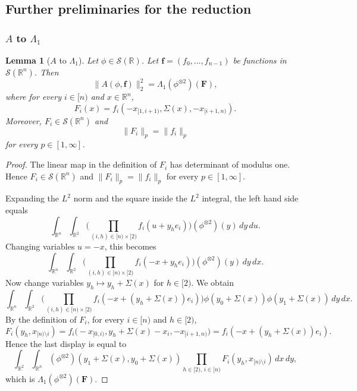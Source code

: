 \documentclass[12pt,reqno]{amsart}
\theoremstyle{plain}
\newtheorem{lemma}[theorem]{Lemma}
\numberwithin{equation}{section}
\theoremstyle{remark}
\newcommand{\R}{{\mathbb R}}
\begin{document}
\subsection{Further preliminaries for the reduction}\label{sec:prelim red}

\subsubsection{\texorpdfstring{$A$ to $\Lambda_1$}{Average to prism form}}

\begin{lemma}[$A$ to $\Lambda_1$]\label{A to Lambda}
Let $\phi\in \mathcal{S}(\R)$.
Let $\mathbf{f}=(f_0,\dots,f_{n-1})$ be functions in $\mathcal{S}(\R^n)$.
Then
\begin{equation}\label{auto:twisted-average-prism-identity}
\|A(\phi, {\mathbf f})\|_2^2 = \Lambda_1(\phi^{\otimes 2})(\mathbf{F}),
\end{equation}
where for every $i\in[n)$ and $x\in\R^n$,
\begin{equation}\label{auto:twisted-average-coordinate-transform}
F_i(x)=f_i(-x_{[1,i+1)},\Sigma(x),-x_{[i+1,n)}).
\end{equation}
Moreover, $F_i\in\mathcal S(\R^n)$ and
\begin{equation}\label{auto:twisted-average-coordinate-transform-isometry}
\|F_i\|_p=\|f_i\|_p
\end{equation}
for every $p\in[1,\infty]$.
\end{lemma}

\begin{proof}
The linear map in the definition of $F_i$ has determinant of modulus one. Hence $F_i\in\mathcal S(\R^n)$ and $\|F_i\|_p=\|f_i\|_p$ for every $p\in[1,\infty]$.

Expanding the $L^2$ norm and the square inside the $L^2$ integral, the left hand side equals
\[
 \int_{\R^n} \int_{\mathbb{R}^2}
 \Big(\prod_{(i,h)\in [n)\times [2)} f_i(u+y_h e_i) \Big)
 (\phi^{\otimes 2})(y)\, dy\, du .
\]
Changing variables $u=-x$, this becomes
\[
 \int_{\R^n} \int_{\mathbb{R}^2}
 \Big(\prod_{(i,h)\in [n)\times [2)} f_i(-x+y_h e_i) \Big)
 (\phi^{\otimes 2})(y)\, dy\, dx .
\]
Now change variables $y_h\mapsto y_h+\Sigma(x)$ for $h\in[2)$. We obtain
\[
 \int_{\R^n} \int_{\mathbb{R}^2}
 \Big(\prod_{(i,h)\in [n)\times [2)}
 f_i(-x+(y_h+\Sigma(x))e_i) \Big)
 \phi(y_0+\Sigma(x))\phi(y_1+\Sigma(x))\, dy\, dx .
\]
By the definition of $F_i$, for every $i\in[n)$ and $h\in[2)$,
\[
 F_i(y_h,x_{[n)\setminus i})
 =
 f_i\bigl(-x_{[0,i)},y_h+\Sigma(x)-x_i,-x_{[i+1,n)}\bigr)
 =
 f_i(-x+(y_h+\Sigma(x))e_i).
\]
Hence the last display is equal to
\[
 \int_{\R^2}\int_{\R^n}
 (\phi^{\otimes 2})(y_1+\Sigma(x),y_0+\Sigma(x))
 \prod_{h\in[2),\,i\in[n)}
 F_i(y_h,x_{[n)\setminus i})\,dx\,dy ,
\]
which is $\Lambda_1(\phi^{\otimes 2})(\mathbf{F})$.
\end{proof}
\end{document}
